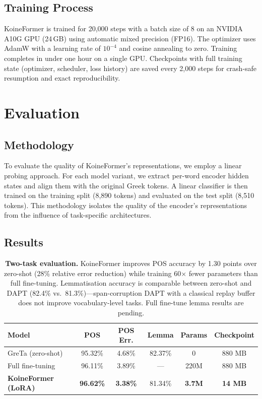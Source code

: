 \documentclass[11pt,letterpaper]{article}
\newcommand{\tblhead}{\rowcolor{marine!12}}
\begin{document}
\subsection{Training Process}

KoineFormer is trained for 20,000 steps with a batch size of 8 on an NVIDIA A10G GPU (24\,GB) using automatic mixed precision (FP16). The optimizer uses AdamW with a learning rate of $10^{-4}$ and cosine annealing to zero. Training completes in under one hour on a single GPU. Checkpoints with full training state (optimizer, scheduler, loss history) are saved every 2,000 steps for crash-safe resumption and exact reproducibility.

\section{Evaluation}
\label{sec:evaluation}

\subsection{Methodology}

To evaluate the quality of KoineFormer's representations, we employ a linear probing approach. For each model variant, we extract per-word encoder hidden states and align them with the original Greek tokens. A linear classifier is then trained on the training split (8,890 tokens) and evaluated on the test split (8,510 tokens). This methodology isolates the quality of the encoder's representations from the influence of task-specific architectures.

\subsection{Results}

\begin{table}[H]
\centering
\begin{tabular}{lccccc}
\toprule
\tblhead\textbf{Model} & \textbf{POS} & \textbf{POS Err.} & \textbf{Lemma} & \textbf{Params} & \textbf{Checkpoint} \\
\midrule
GreTa (zero-shot) & 95.32\% & 4.68\% & 82.37\% & 0 & 880 MB \\
Full fine-tuning & 96.11\% & 3.89\% & --- & 220M & 880 MB \\
\rowcolor{terracotta!12}\textbf{KoineFormer (LoRA)} & \textbf{96.62\%} & \textbf{3.38\%} & 81.34\% & \textbf{3.7M} & \textbf{14 MB} \\
\bottomrule
\end{tabular}
\caption{\textbf{Two-task evaluation.} KoineFormer improves POS accuracy by 1.30 points over zero-shot (28\% relative error reduction) while training 60$\times$ fewer parameters than full fine-tuning. Lemmatisation accuracy is comparable between zero-shot and DAPT (82.4\% vs.\ 81.3\%)---span-corruption DAPT with a classical replay buffer does not improve vocabulary-level tasks. Full fine-tune lemma results are pending.}
\label{tab:results}
\end{table}
\end{document}
